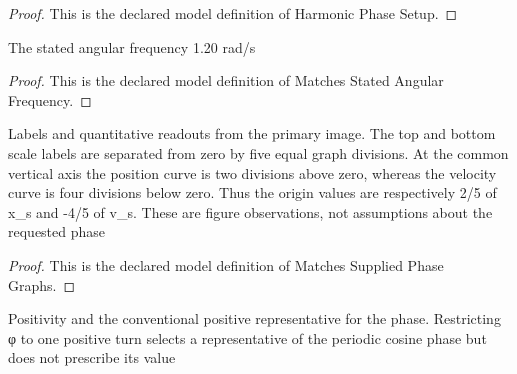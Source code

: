 \begin{proof}
  This is the declared model definition of Harmonic Phase Setup.
\end{proof}
\begin{definition}
  \label{def:physics:phyx-mini-0254:phyxminiproblems-problemphyxmini0254-matchesstatedangularfrequency}
  The stated angular frequency 1.20 rad/s
\end{definition}
\begin{proof}
  This is the declared model definition of Matches Stated Angular Frequency.
\end{proof}
\begin{definition}
  \label{def:physics:phyx-mini-0254:phyxminiproblems-problemphyxmini0254-matchessuppliedphasegraphs}
  Labels and quantitative readouts from the primary image. The top and bottom scale labels are separated from zero by five equal graph divisions. At the common vertical axis the position curve is two divisions above zero, whereas the velocity curve is four divisions below zero. Thus the origin values are respectively 2/5 of x\_s and -4/5 of v\_s. These are figure observations, not assumptions about the requested phase
\end{definition}
\begin{proof}
  This is the declared model definition of Matches Supplied Phase Graphs.
\end{proof}
\begin{definition}
  \label{def:physics:phyx-mini-0254:phyxminiproblems-problemphyxmini0254-hasphysicalharmonicparameters}
  Positivity and the conventional positive representative for the phase. Restricting φ to one positive turn selects a representative of the periodic cosine phase but does not prescribe its value
\end{definition}
